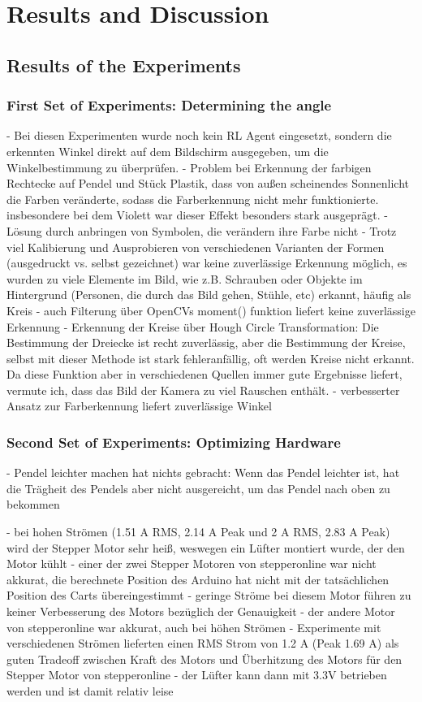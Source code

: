 \chapter{Results and Discussion}

\section{Results of the Experiments}

\subsection{First Set of Experiments: Determining the angle}
- Bei diesen Experimenten wurde noch kein RL Agent eingesetzt, sondern die erkennten Winkel direkt auf dem Bildschirm ausgegeben, um die Winkelbestimmung zu überprüfen.
- Problem bei Erkennung der farbigen Rechtecke auf Pendel und Stück Plastik,  dass von außen scheinendes Sonnenlicht die Farben veränderte, sodass die Farberkennung nicht mehr funktionierte. insbesondere bei dem Violett war dieser Effekt besonders stark ausgeprägt.
- Lösung durch anbringen von Symbolen, die verändern ihre Farbe nicht
- Trotz viel Kalibierung und Ausprobieren von verschiedenen Varianten der Formen (ausgedruckt vs. selbst gezeichnet) war keine zuverlässige Erkennung möglich, es wurden zu viele Elemente im Bild, wie z.B. Schrauben oder Objekte im Hintergrund (Personen, die durch das Bild gehen, Stühle, etc) erkannt, häufig als Kreis
- auch Filterung über OpenCVs moment() funktion liefert keine zuverlässige Erkennung
- Erkennung der Kreise über Hough Circle Transformation: Die Bestimmung der Dreiecke ist recht zuverlässig, aber die Bestimmung der Kreise, selbst mit dieser Methode ist stark fehleranfällig, oft werden Kreise nicht erkannt. Da diese Funktion aber in verschiedenen Quellen immer gute Ergebnisse liefert, vermute ich, dass das Bild der Kamera zu viel Rauschen enthält.
- verbesserter Ansatz zur Farberkennung liefert zuverlässige Winkel

\subsection{Second Set of Experiments: Optimizing Hardware}
- Pendel leichter machen hat nichts gebracht: Wenn das Pendel leichter ist, hat die Trägheit des Pendels aber nicht ausgereicht, um das Pendel nach oben zu bekommen

- bei hohen Strömen (1.51 A RMS, 2.14 A Peak und 2 A RMS, 2.83 A Peak) wird der Stepper Motor sehr heiß, weswegen ein Lüfter montiert wurde, der den Motor kühlt
- einer der zwei Stepper Motoren von stepperonline war nicht akkurat, die berechnete Position des Arduino hat nicht mit der tatsächlichen Position des Carts übereingestimmt
- geringe Ströme bei diesem Motor führen zu keiner Verbesserung des Motors bezüglich der Genauigkeit
- der andere Motor von stepperonline war akkurat, auch bei höhen Strömen
- Experimente mit verschiedenen Strömen lieferten einen RMS Strom von 1.2 A (Peak 1.69 A) als guten Tradeoff zwischen Kraft des Motors und Überhitzung des Motors für den Stepper Motor von stepperonline
- der Lüfter kann dann mit 3.3V betrieben werden und ist damit relativ leise

